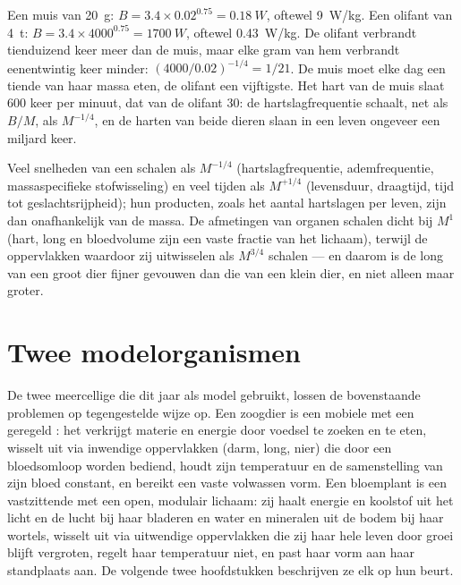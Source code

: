 \begin{example}\label{ex:b1:organism-environment:mouseelephant}
Een muis van \qty{20}{g}: $B = 3.4\times 0.02^{0.75} = \qty{0.18}{W}$, oftewel
\qty{9}{W/kg}. Een olifant van \qty{4}{t}: $B = 3.4\times 4000^{0.75} =
\qty{1700}{W}$, oftewel \qty{0.43}{W/kg}. De olifant verbrandt tienduizend keer
meer dan de muis, maar elke gram van hem verbrandt eenentwintig keer minder:
$(4000/0.02)^{-1/4} = 1/21$. De muis moet elke dag een tiende van haar massa
eten, de olifant een vijftigste. Het hart van de muis slaat \qty{600}{} keer
per minuut, dat van de olifant \qty{30}{}: de hartslagfrequentie schaalt, net
als $B/M$, als $M^{-1/4}$, en de harten van beide dieren slaan in een leven
ongeveer een miljard keer.
\end{example}

\begin{remark}\label{rem:b1:organism-environment:consequences}
Veel snelheden van een  schalen als $M^{-1/4}$ (hartslagfrequentie,
ademfrequentie, massaspecifieke stofwisseling) en veel tijden als $M^{+1/4}$
(levensduur, draagtijd, tijd tot geslachtsrijpheid); hun producten, zoals het
aantal hartslagen per leven, zijn dan onafhankelijk van de massa. De afmetingen
van organen schalen dicht bij $M^{1}$ (hart, long en bloedvolume zijn een vaste
fractie van het lichaam), terwijl de oppervlakken waardoor zij uitwisselen als
$M^{3/4}$ schalen --- en daarom is de long van een groot dier fijner gevouwen
dan die van een klein dier, en niet alleen maar groter.
\end{remark}

\section{Twee modelorganismen}

\begin{proposition}\label{prop:b1:organism-environment:models}
De twee meercellige  die dit jaar als model gebruikt, lossen de
bovenstaande problemen op tegengestelde wijze op. Een zoogdier is een mobiele
 met een geregeld : het verkrijgt materie en energie
door voedsel te zoeken en te eten, wisselt uit via inwendige oppervlakken
(darm, long, nier) die door een bloedsomloop worden bediend, houdt zijn
temperatuur en de samenstelling van zijn bloed constant, en bereikt een vaste
volwassen vorm. Een bloemplant is een vastzittende  met een open,
modulair lichaam: zij haalt energie en koolstof uit het licht en de lucht bij
haar bladeren en water en mineralen uit de bodem bij haar wortels, wisselt uit
via uitwendige oppervlakken die zij haar hele leven door groei blijft
vergroten, regelt haar temperatuur niet, en past haar vorm aan haar standplaats
aan. De volgende twee hoofdstukken beschrijven ze elk op hun beurt.
\end{proposition}

